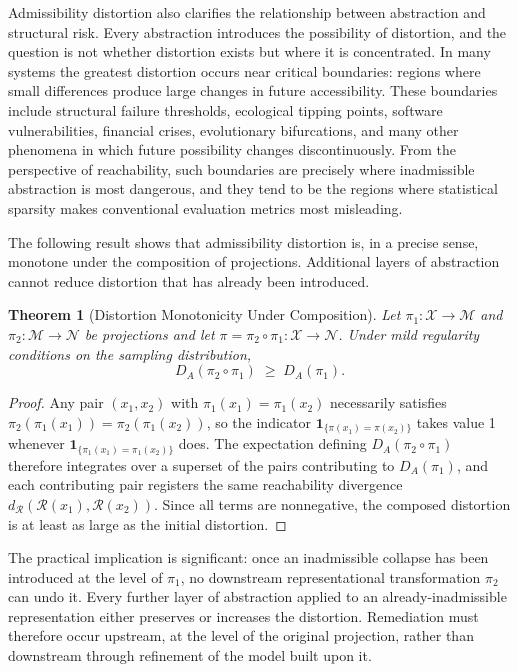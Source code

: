 \documentclass[12pt,a4paper]{article}
\theoremstyle{plain}
\newtheorem{theorem}{Theorem}
\theoremstyle{definition}
\theoremstyle{remark}
\begin{document}
Admissibility distortion also clarifies the relationship between abstraction
and structural risk. Every abstraction introduces the possibility of
distortion, and the question is not whether distortion exists but where it
is concentrated. In many systems the greatest distortion occurs near critical
boundaries: regions where small differences produce large changes in future
accessibility. These boundaries include structural failure thresholds,
ecological tipping points, software vulnerabilities, financial crises,
evolutionary bifurcations, and many other phenomena in which future
possibility changes discontinuously. From the perspective of reachability,
such boundaries are precisely where inadmissible abstraction is most
dangerous, and they tend to be the regions where statistical sparsity makes
conventional evaluation metrics most misleading.

The following result shows that admissibility distortion is, in a precise
sense, monotone under the composition of projections. Additional layers of
abstraction cannot reduce distortion that has already been introduced.

\begin{theorem}[Distortion Monotonicity Under Composition]
Let $\pi_1 : \mathcal{X} \to \mathcal{M}$ and $\pi_2 : \mathcal{M} \to
\mathcal{N}$ be projections and let $\pi = \pi_2 \circ \pi_1 :
\mathcal{X} \to \mathcal{N}$. Under mild regularity conditions on the
sampling distribution,
\[
  D_A(\pi_2 \circ \pi_1) \;\geq\; D_A(\pi_1).
\]
\end{theorem}

\begin{proof}
Any pair $(x_1, x_2)$ with $\pi_1(x_1) = \pi_1(x_2)$ necessarily satisfies
$\pi_2(\pi_1(x_1)) = \pi_2(\pi_1(x_2))$, so the indicator
$\mathbf{1}_{\{\pi(x_1)=\pi(x_2)\}}$ takes value 1 whenever
$\mathbf{1}_{\{\pi_1(x_1)=\pi_1(x_2)\}}$ does. The expectation defining
$D_A(\pi_2 \circ \pi_1)$ therefore integrates over a superset of the pairs
contributing to $D_A(\pi_1)$, and each contributing pair registers the same
reachability divergence $d_{\mathcal{R}}(\mathcal{R}(x_1),
\mathcal{R}(x_2))$. Since all terms are nonnegative, the composed distortion
is at least as large as the initial distortion.
\end{proof}

The practical implication is significant: once an inadmissible collapse has
been introduced at the level of $\pi_1$, no downstream representational
transformation $\pi_2$ can undo it. Every further layer of abstraction
applied to an already-inadmissible representation either preserves or
increases the distortion. Remediation must therefore occur upstream, at the
level of the original projection, rather than downstream through refinement
of the model built upon it.
\end{document}
